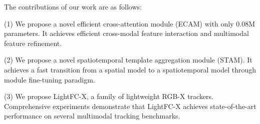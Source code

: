 The contributions of our work are as follows:

(1) We propose a novel efficient cross-attention module (ECAM) with only 0.08M parameters. It achieves efficient cross-modal feature interaction and multimodal feature refinement.


(2) We propose a novel spatiotemporal template aggregation module (STAM). It achieves a fast transition from a spatial model to a spatiotemporal model through module fine-tuning paradigm.

(3) We propose LightFC-X, a family of lightweight RGB-X trackers. Comprehensive experiments demonstrate that LightFC-X achieves state-of-the-art performance on several multimodal tracking benchmarks.